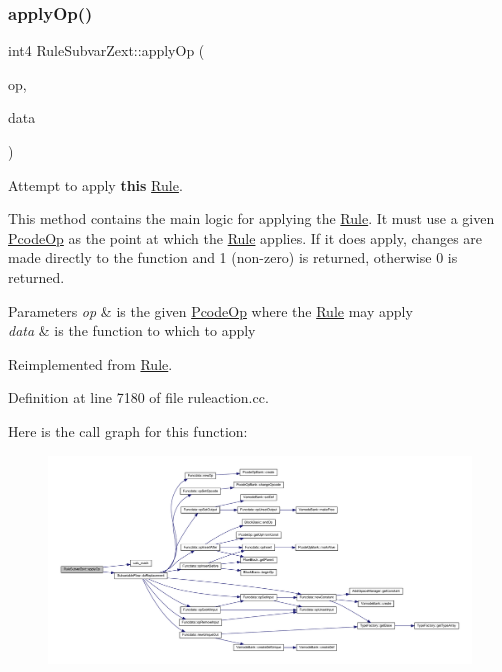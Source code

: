 \subsubsection{\texorpdfstring{applyOp()}{applyOp()}}
{\footnotesize\ttfamily int4 Rule\+Subvar\+Zext\+::apply\+Op (\begin{DoxyParamCaption}\item[{\mbox{\hyperlink{class_pcode_op}{Pcode\+Op}} $\ast$}]{op,  }\item[{\mbox{\hyperlink{class_funcdata}{Funcdata}} \&}]{data }\end{DoxyParamCaption})\hspace{0.3cm}{\ttfamily [virtual]}}



Attempt to apply {\bfseries{this}} \mbox{\hyperlink{class_rule}{Rule}}. 

This method contains the main logic for applying the \mbox{\hyperlink{class_rule}{Rule}}. It must use a given \mbox{\hyperlink{class_pcode_op}{Pcode\+Op}} as the point at which the \mbox{\hyperlink{class_rule}{Rule}} applies. If it does apply, changes are made directly to the function and 1 (non-\/zero) is returned, otherwise 0 is returned. 
\begin{DoxyParams}{Parameters}
{\em op} & is the given \mbox{\hyperlink{class_pcode_op}{Pcode\+Op}} where the \mbox{\hyperlink{class_rule}{Rule}} may apply \\
\hline
{\em data} & is the function to which to apply \\
\hline
\end{DoxyParams}


Reimplemented from \mbox{\hyperlink{class_rule_a4e3e61f066670175009f60fb9dc60848}{Rule}}.



Definition at line 7180 of file ruleaction.\+cc.

Here is the call graph for this function\+:
\nopagebreak
\begin{figure}[H]
\begin{center}
\leavevmode
\includegraphics[width=350pt]{class_rule_subvar_zext_a9336da44138d6e55d5702de806649402_cgraph}
\end{center}
\end{figure}
\mbox{\label{class_rule_subvar_zext_a2838537725e8d3dcb0c6bc0ce8fc1958}} 
